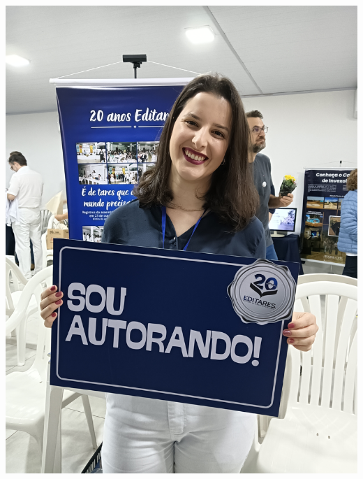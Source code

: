 \documentclass{gescons}
\begin{document}
  \begin{minipage}[b]{0.32\textwidth}
    \includegraphics[width=\linewidth]{articles/resumo/fotos/materia2/IMG20241208144202.jpg}
  \end{minipage}
\end{document}
